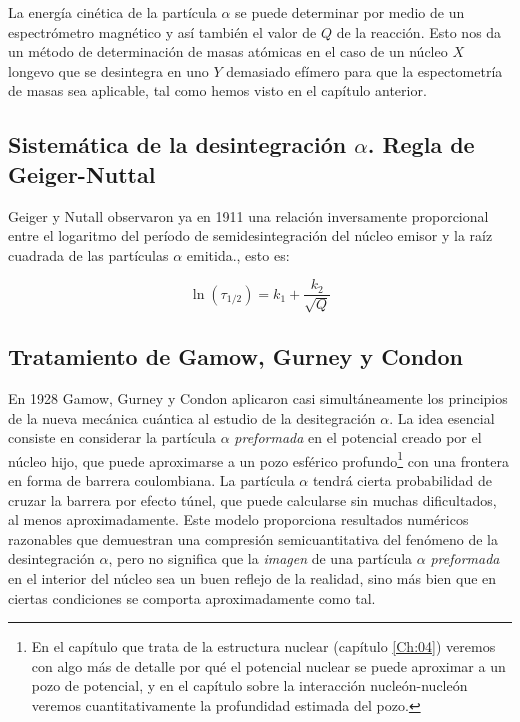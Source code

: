 La energía cinética de la partícula $\alpha$ se puede determinar por medio de un espectrómetro magnético y así también el valor de $Q$ de la reacción. Esto nos da un método de determinación de masas atómicas en el caso de un núcleo $X$ longevo que se desintegra en uno $Y$ demasiado efímero para que la espectometría de masas sea aplicable, tal como hemos visto en el capítulo anterior.

\subsection{Sistemática de la desintegración $\alpha$. Regla de Geiger-Nuttal}

Geiger y Nutall observaron ya en 1911 una relación inversamente proporcional entre el logaritmo del período de semidesintegración del núcleo emisor y la raíz cuadrada de las partículas $\alpha$ emitida., esto es:

\begin{equation}
\ln (\tau_{1/2}) = k_1 + \frac{k_2}{\sqrt{Q}}
\end{equation}

\subsection{Tratamiento de Gamow, Gurney y Condon}

En 1928 Gamow, Gurney y Condon aplicaron casi simultáneamente los principios de la nueva mecánica cuántica al estudio de la desitegración $\alpha$. La idea esencial consiste en considerar la partícula $\alpha$ \textit{preformada} en el potencial creado por el núcleo hijo, que puede aproximarse a un pozo esférico profundo\footnote{En el capítulo que trata de la estructura nuclear (capítulo \ref{Ch:04}) veremos con algo más de detalle por qué el potencial nuclear se puede aproximar a un pozo de potencial, y en el capítulo sobre la interacción nucleón-nucleón veremos cuantitativamente la profundidad estimada del pozo.} con una frontera en forma de barrera coulombiana. La partícula $\alpha$ tendrá cierta probabilidad de cruzar la barrera por efecto túnel, que puede calcularse sin muchas dificultados, al menos aproximadamente. Este modelo proporciona resultados numéricos razonables que demuestran una compresión semicuantitativa del fenómeno de la desintegración $\alpha$, pero no significa que la \textit{imagen} de una partícula $\alpha$ \textit{preformada} en el interior del núcleo sea un buen reflejo de la realidad, sino más bien que en ciertas condiciones se comporta aproximadamente como tal.

